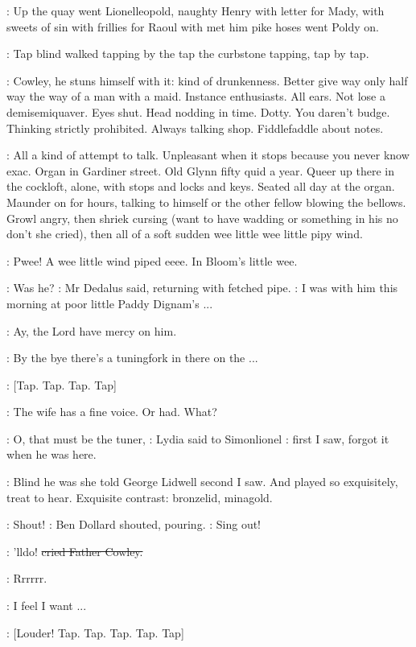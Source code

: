 :
Up the quay went Lionelleopold,
naughty Henry with letter for
Mady,
with sweets of sin with frillies for Raoul with met him pike hoses
went Poldy on.

:
Tap blind walked
tapping by the tap the curbstone tapping,
tap by tap.

\BloomInt:
Cowley,
he stuns himself with it:
kind of drunkenness.
Better give
way only half way the way of a man with a maid.
Instance enthusiasts.
All
ears.
Not lose a demisemiquaver.
Eyes shut.
Head nodding in time.
Dotty.
You daren't budge.
Thinking strictly prohibited.
Always talking shop.
Fiddlefaddle about notes.

\BloomInt:
All a kind of attempt to talk.
Unpleasant when it stops because you
never know exac.
Organ in Gardiner street.
Old Glynn fifty quid a year.
Queer up there in the cockloft,
alone,
with stops and locks and keys.
Seated all day at the organ.
Maunder on for hours,
talking to himself or
the other fellow blowing the bellows.
Growl angry,
then shriek cursing
(want to have wadding or something in his no don't she cried),
then all of
a soft sudden wee little wee little pipy wind.

:
Pwee!
A wee little wind piped eeee.
In Bloom's little wee.

\simon:
Was he?
:
Mr Dedalus said,
returning with fetched pipe.
\simon:
I was with him this morning at poor little Paddy Dignam's ...

\cowley:
Ay,
the Lord have mercy on him.

\simon:
By the bye there's a tuningfork in there on the ...

\stripling:
[Tap.
Tap.
Tap.
Tap]

\lidwell:
The wife has a fine voice.
Or had.
What?

\MissD:
O,
that must be the tuner,
:
Lydia said to Simonlionel
\MissD:
first I saw,
forgot
it when he was here.

:
Blind he was she told George Lidwell second I saw.
And played so
exquisitely,
treat to hear.
Exquisite contrast:
bronzelid,
minagold.

\dollard:
Shout!
:
Ben Dollard shouted,
pouring.
\dollard:
Sing out!

\cowley:
'lldo!
\sout{cried Father Cowley.}

:
Rrrrrr.

\BloomInt:
I feel I want ...

\stripling:
[Louder!
Tap.
Tap.
Tap.
Tap.
Tap]

